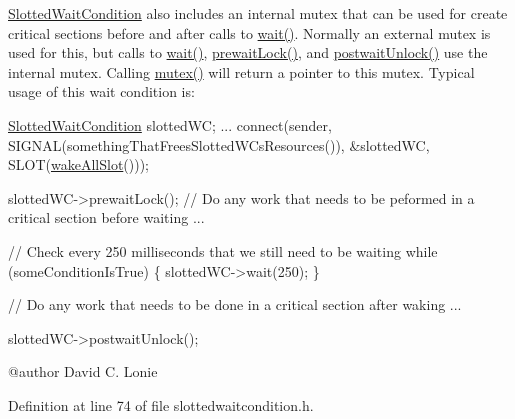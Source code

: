 \hyperlink{classGlobalSearch_1_1SlottedWaitCondition}{Slotted\-Wait\-Condition} also includes an internal mutex that can be used for create critical sections before and after calls to \hyperlink{classGlobalSearch_1_1SlottedWaitCondition_a30999486ab4737cda3c4e93f8625ac1f}{wait()}. Normally an external mutex is used for this, but calls to \hyperlink{classGlobalSearch_1_1SlottedWaitCondition_a30999486ab4737cda3c4e93f8625ac1f}{wait()}, \hyperlink{classGlobalSearch_1_1SlottedWaitCondition_afb1ba4315ffa2de59eaf5045d2a4c09f}{prewait\-Lock()}, and \hyperlink{classGlobalSearch_1_1SlottedWaitCondition_a3c9f9e3ba7eebdc3cc270445385e334c}{postwait\-Unlock()} use the internal mutex. Calling \hyperlink{classGlobalSearch_1_1SlottedWaitCondition_af548d9a604d2ec84083e5c92ca1a3849}{mutex()} will return a pointer to this mutex. Typical usage of this wait condition is\-: 
\begin{DoxyCode}
\hyperlink{classGlobalSearch_1_1SlottedWaitCondition_a4fd4c5343242d8961fd893012ba9f54b}{SlottedWaitCondition} slottedWC;
...
connect(sender, SIGNAL(somethingThatFreesSlottedWCsResources()),
        &slottedWC, SLOT(\hyperlink{classGlobalSearch_1_1SlottedWaitCondition_a4024066fe5db52f2e2c9257fcfbb5320}{wakeAllSlot}()));

slottedWC->prewaitLock();
\textcolor{comment}{// Do any work that needs to be peformed in a critical section before waiting}
...

\textcolor{comment}{// Check every 250 milliseconds that we still need to be waiting}
while (someConditionIsTrue) \{
  slottedWC->wait(250);
\}

\textcolor{comment}{// Do any work that needs to be done in a critical section after waking}
...

slottedWC->postwaitUnlock();
\end{DoxyCode}
 \begin{DoxyVerb} @author David C. Lonie\end{DoxyVerb}
 

Definition at line 74 of file slottedwaitcondition.\-h.



